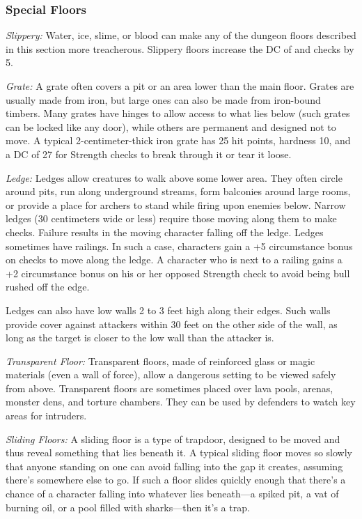 \subsubsection{Special Floors}

\textit{Slippery:} Water, ice, slime, or blood can make any of the dungeon floors described in this section more treacherous. Slippery floors increase the DC of  and  checks by 5.

\textit{Grate:} A grate often covers a pit or an area lower than the main floor. Grates are usually made from iron, but large ones can also be made from iron-bound timbers. Many grates have hinges to allow access to what lies below (such grates can be locked like any door), while others are permanent and designed not to move. A typical 2-centimeter-thick iron grate has 25 hit points, hardness 10, and a DC of 27 for Strength checks to break through it or tear it loose.

\textit{Ledge:} Ledges allow creatures to walk above some lower area. They often circle around pits, run along underground streams, form balconies around large rooms, or provide a place for archers to stand while firing upon enemies below. Narrow ledges (30 centimeters wide or less) require those moving along them to make  checks. Failure results in the moving character falling off the ledge. Ledges sometimes have railings. In such a case, characters gain a +5 circumstance bonus on  checks to move along the ledge. A character who is next to a railing gains a +2 circumstance bonus on his or her opposed Strength check to avoid being bull rushed off the edge.

Ledges can also have low walls 2 to 3 feet high along their edges. Such walls provide cover against attackers within 30 feet on the other side of the wall, as long as the target is closer to the low wall than the attacker is.

\textit{Transparent Floor:} Transparent floors, made of reinforced glass or magic materials (even a wall of force), allow a dangerous setting to be viewed safely from above. Transparent floors are sometimes placed over lava pools, arenas, monster dens, and torture chambers. They can be used by defenders to watch key areas for intruders.

\textit{Sliding Floors:} A sliding floor is a type of trapdoor, designed to be moved and thus reveal something that lies beneath it. A typical sliding floor moves so slowly that anyone standing on one can avoid falling into the gap it creates, assuming there's somewhere else to go. If such a floor slides quickly enough that there's a chance of a character falling into whatever lies beneath---a spiked pit, a vat of burning oil, or a pool filled with sharks---then it's a trap.

